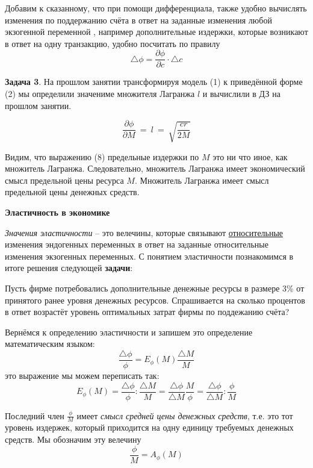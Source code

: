 \documentclass[12pt,a4paper]{article}
\begin{document}
Добавим к сказанному, что при помощи дифференциала, также удобно вычислять изменения по поддержанию счёта в ответ на заданные изменения любой экзогенной переменной , например дополнительные издержки, которые возникают в ответ на одну транзакцию, удобно посчитать по правилу
\begin{equation}
\triangle \phi = \frac{\partial \phi}{\partial c} \cdot \triangle c
\end{equation}

\textbf{Задача 3}. На прошлом занятии трансформируя модель (1) к приведённой форме (2) мы определили значениме множителя Лагранжа $l$ и вычислили в ДЗ на прошлом занятии.

\begin{equation}
\frac{\partial \phi }{\partial M} \ =\ l\ =\ \sqrt{\frac{cr}{2M}}
\end{equation}

Видим, что выражению (8) предельные издержки по $M$ это ни что иное, как множитель Лагранжа. Следовательно, множитель Лагранжа имеет экономический смысл предельной цены ресурса $M$. Множитель Лагранжа имеет смысл предельной цены денежных средств.

 \textbf{Эластичность в экономике}

\textit{Значения эластичности} -- это велечины, которые связывают \underline{относительные} изменения эндогенных переменных в ответ на заданные относительные изменения экзогенных переменных. С понятием эластичности познакомимся в итоге решения следующей \textbf{задачи}:

Пусть фирме потребовались дополнительные денежные ресурсы в размере 3\% от принятого ранее уровня денежных ресурсов. Спрашивается на сколько процентов в ответ возрастёт уровень оптимальных затрат фирмы по поддежанию счёта?

Вернёмся к определению эластичности и запишем это определение математическим языком:
\begin{equation}
\frac{\triangle \phi}{\phi} = E_\phi(M) \frac{\triangle M}{M}
\end{equation}
это выражение мы можем переписать так:
\begin{equation}
E_\phi(M) = \frac{\triangle \phi}{\phi} : \frac{\triangle M}{M} = \frac{\triangle \phi}{\triangle M} \frac{M}{\phi} = \frac{\triangle \phi}{\triangle M} : \frac{\phi}{M}
\end{equation}

Последний член $\displaystyle{\frac{\phi}{M}}$ имеет \textit{смысл средней цены денежных средств}, т.е. это тот уровень издержек, который приходится на одну единицу требуемых денежных средств. Мы обозначим эту велечину
\begin{equation}
\frac{\phi}{M} = A_{\phi} (M)
\end{equation}
\end{document}
